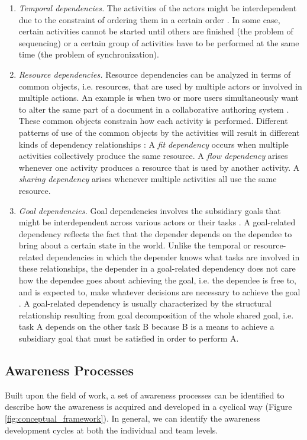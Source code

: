 \begin{enumerate}
	\item \emph{Temporal dependencies.} The activities of the actors might be interdependent due to the constraint of ordering them in a certain order \cite{sikora1998a}. In some case, certain activities cannot be started until others are finished (the problem of sequencing) or a certain group of activities have to be performed at the same time (the problem of synchronization).
	\item \emph{Resource dependencies.} Resource dependencies can be analyzed in terms of common objects, i.e. resources, that are used by multiple actors or involved in multiple actions. An example is when two or more users simultaneously want to alter the same part of a document in a collaborative authoring system \cite{berlage1999a}. These common objects constrain how each activity is performed. Different patterns of use of the common objects by the activities will result in different kinds of dependency relationships \cite{malone1990coordination}: A \emph{fit dependency} occurs when multiple activities collectively produce the same resource. A \emph{flow dependency} arises whenever one activity produces a resource that is used by another activity. A \emph{sharing dependency} arises whenever multiple activities all use the same resource.
	\item \emph{Goal dependencies.} Goal dependencies involves the subsidiary goals that might be interdependent across various actors or their tasks \cite{sikora1998a}. A goal-related dependency reflects the fact that the depender depends on the dependee to bring about a certain state in the world. Unlike the temporal or resource-related dependencies in which the depender knows what tasks are involved in these relationships, the depender in a goal-related dependency does not care how the dependee goes about achieving the goal, i.e. the dependee is free to, and is expected to, make whatever decisions are necessary to achieve the goal \cite{yu1993actor}. A goal-related dependency is usually characterized by the structural relationship resulting from goal decomposition of the whole shared goal, i.e. task A depends on the other task B because B is a means to achieve a subsidiary goal that must be satisfied in order to perform A.
\end{enumerate}

\subsection{Awareness Processes} %
\label{sub:awareness_processes}
Built upon the field of work, a set of awareness processes can be identified to describe how the awareness is acquired and developed in a cyclical way (Figure \ref{fig:conceptual_framework}). In general, we can identify the awareness development cycles at both the individual and team levels.

